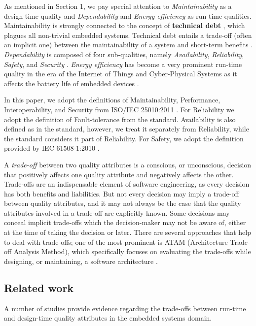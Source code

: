 As mentioned in Section 1, we pay special attention to  \textit{Maintainability} as a design-time quality and \textit{Dependability} and \textit{Energy-efficiency} as run-time qualities. Maintainability is strongly connected to the concept of \textbf{technical debt} \cite{Kruchten2012}, which plagues all non-trivial embedded systems. Technical debt entails a trade-off (often an implicit one) between the maintainability of a system and  short-term benefits \cite{Kruchten2012}. %
\textit{Dependability} is composed of four sub-qualities, namely \textit{Availability}, \textit{Reliability}, \textit{Safety}, and \textit{Security} \cite{JCLaprie1992}. \textit{Energy efficiency} has become a very prominent run-time quality in the era of the Internet of Things and Cyber-Physical Systems as it affects the battery life of embedded devices \cite{Sherman2008}.

In this paper, we adopt the definitions of Maintainability, Performance, Interoperability, and Security from ISO/IEC 25010:2011 \cite{ISO25010}. For Reliability we adopt the definition of Fault-tolerance from the standard. Availability is also defined as in the standard, however, we treat it separately from Reliability, while the standard considers it part of Reliability.
For Safety, we adopt the definition provided by IEC 61508-1:2010 \cite{IEC61508}. 

A \textit{trade-off} between two quality attributes is a conscious, or unconscious, decision that positively affects one quality attribute and negatively affects the other.
Trade-offs are an indispensable element of software engineering, as every decision has both benefits and liabilities.
But not every decision may imply a trade-off between quality attributes, and it may not always be the case that the quality attributes involved in a trade-off are explicitly known.
Some decisions may conceal implicit trade-offs which the decision-maker may not be aware of, either at the time of taking the decision or later.
There are several approaches that help to deal with trade-offs; one of the most prominent is ATAM (Architecture Trade-off Analysis Method), which specifically focuses on evaluating the trade-offs while designing, or maintaining, a software architecture \cite{Bass2012,Clements2003}.

\subsection{Related work}
A number of studies provide evidence regarding the trade-offs between run-time and design-time quality attributes in the embedded systems domain.

